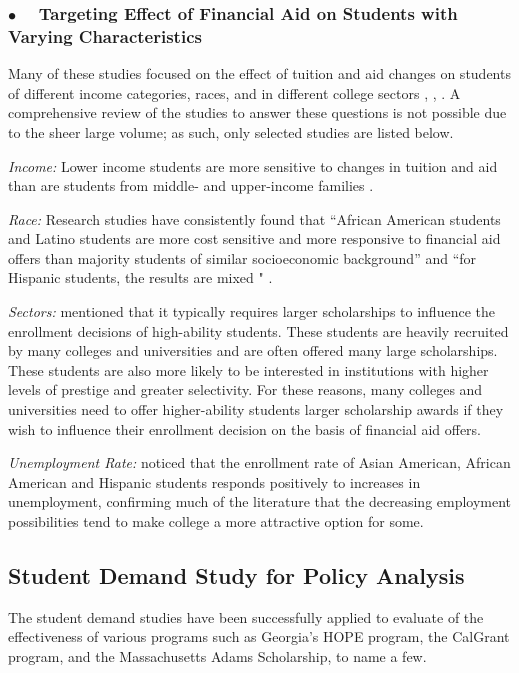 \documentclass[12pt,english]{report}
\begin{document}
\subsubsection{$\bullet \quad$  Targeting Effect of Financial Aid on Students with Varying Characteristics }
Many of these studies focused on the effect of tuition and aid changes on students of different income categories, races, and in different college sectors \citep{Jackson1978}, \citep{Braunstein1999}, \citep{Heller1997}.  A comprehensive review of the studies to answer these questions is not possible due to the sheer large volume; as such, only selected studies are listed below.

\vspace{0.15in}
\noindent \textit{Income: } Lower income students are more sensitive to changes in tuition and aid than are students from middle- and upper-income families \citep{Crouse2015}.

\vspace{0.15in}
\noindent \textit{Race: }  Research studies have consistently found that ``African American students and Latino students are more cost sensitive and more responsive to financial aid offers than majority students of similar
socioeconomic background''  and ``for Hispanic students, the results are mixed " \citet{Hossler1989}.

\vspace{0.15in}
\noindent \textit{Sectors: }  \citet{Heller1999} mentioned that it typically requires larger scholarships to influence the enrollment decisions of high-ability students.  These students are heavily recruited by many colleges and universities and are often offered many large scholarships. These students are also more likely to be interested in institutions with higher levels of prestige and greater selectivity.  For these reasons, many colleges and universities need to offer higher-ability students larger scholarship awards if they wish to influence their enrollment decision on the basis of financial aid offers.

\vspace{0.25in}
\noindent \textit{Unemployment Rate:}  \citet{Heller1999} noticed that the enrollment rate of Asian American, African American and Hispanic students responds positively to increases in unemployment, confirming much of the literature that the decreasing employment possibilities tend to make college a more attractive option for some.

\subsection{Student Demand Study for Policy Analysis }
The student demand studies have been successfully applied to evaluate of the effectiveness of various programs such as Georgia's HOPE program, the CalGrant program,  and the Massachusetts Adams Scholarship, to name a few.
\end{document}

